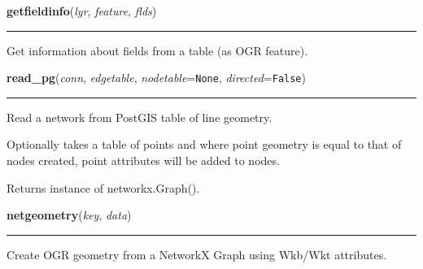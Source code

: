     \label{nx_pg:getfieldinfo}

    \vspace{0.5ex}

\hspace{.8\funcindent}\begin{boxedminipage}{\funcwidth}

    \raggedright \textbf{getfieldinfo}(\textit{lyr}, \textit{feature}, \textit{flds})

    \vspace{-1.5ex}

    \rule{\textwidth}{0.5\fboxrule}
\setlength{\parskip}{2ex}
    Get information about fields from a table (as OGR feature).

\setlength{\parskip}{1ex}
    \end{boxedminipage}

    \label{nx_pg:read_pg}

    \vspace{0.5ex}

\hspace{.8\funcindent}\begin{boxedminipage}{\funcwidth}

    \raggedright \textbf{read\_pg}(\textit{conn}, \textit{edgetable}, \textit{nodetable}={\tt None}, \textit{directed}={\tt False})

    \vspace{-1.5ex}

    \rule{\textwidth}{0.5\fboxrule}
\setlength{\parskip}{2ex}
    Read a network from PostGIS table of line geometry.

    Optionally takes a table of points and where point geometry is equal to
    that of nodes created, point attributes will be added to nodes.

    Returns instance of networkx.Graph().

\setlength{\parskip}{1ex}
    \end{boxedminipage}

    \label{nx_pg:netgeometry}

    \vspace{0.5ex}

\hspace{.8\funcindent}\begin{boxedminipage}{\funcwidth}

    \raggedright \textbf{netgeometry}(\textit{key}, \textit{data})

    \vspace{-1.5ex}

    \rule{\textwidth}{0.5\fboxrule}
\setlength{\parskip}{2ex}
    Create OGR geometry from a NetworkX Graph using Wkb/Wkt attributes.

\setlength{\parskip}{1ex}
    \end{boxedminipage}

